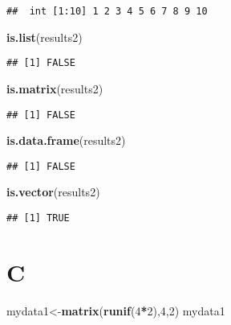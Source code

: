 \documentclass[]{book}
\newenvironment{Shaded}{\begin{snugshade}}{\end{snugshade}}
\newcommand{\KeywordTok}[1]{\textcolor[rgb]{0.13,0.29,0.53}{\textbf{#1}}}
\newcommand{\DecValTok}[1]{\textcolor[rgb]{0.00,0.00,0.81}{#1}}
\newcommand{\OperatorTok}[1]{\textcolor[rgb]{0.81,0.36,0.00}{\textbf{#1}}}
\newcommand{\NormalTok}[1]{#1}
\begin{document}
\begin{verbatim}
##  int [1:10] 1 2 3 4 5 6 7 8 9 10
\end{verbatim}

\begin{Shaded}
\begin{Highlighting}[]
\KeywordTok{is.list}\NormalTok{(results2)}
\end{Highlighting}
\end{Shaded}

\begin{verbatim}
## [1] FALSE
\end{verbatim}

\begin{Shaded}
\begin{Highlighting}[]
\KeywordTok{is.matrix}\NormalTok{(results2)}
\end{Highlighting}
\end{Shaded}

\begin{verbatim}
## [1] FALSE
\end{verbatim}

\begin{Shaded}
\begin{Highlighting}[]
\KeywordTok{is.data.frame}\NormalTok{(results2)}
\end{Highlighting}
\end{Shaded}

\begin{verbatim}
## [1] FALSE
\end{verbatim}

\begin{Shaded}
\begin{Highlighting}[]
\KeywordTok{is.vector}\NormalTok{(results2)}
\end{Highlighting}
\end{Shaded}

\begin{verbatim}
## [1] TRUE
\end{verbatim}

\chapter{C}\label{c}

\begin{Shaded}
\begin{Highlighting}[]
\NormalTok{mydata1<-}\KeywordTok{matrix}\NormalTok{(}\KeywordTok{runif}\NormalTok{(}\DecValTok{4}\OperatorTok{*}\DecValTok{2}\NormalTok{),}\DecValTok{4}\NormalTok{,}\DecValTok{2}\NormalTok{)}
\NormalTok{mydata1}
\end{Highlighting}
\end{Shaded}
\end{document}

